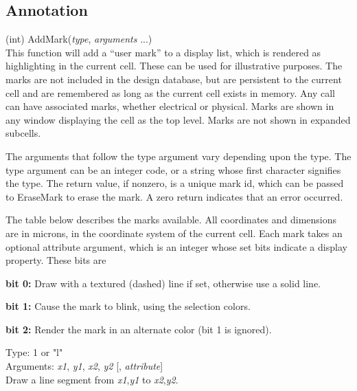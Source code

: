 \subsection{Annotation}

\begin{description}
\item{(int) \vt AddMark({\it type\/}, {\it arguments\/} ...)}\\
This function will add a ``user mark'' to a display list, which is
rendered as highlighting in the current cell.  These can be used for
illustrative purposes.  The marks are not included in the design
database, but are persistent to the current cell and are remembered as
long as the current cell exists in memory.  Any call can have
associated marks, whether electrical or physical.  Marks are shown in
any window displaying the cell as the top level.  Marks are not shown
in expanded subcells.

The arguments that follow the type argument vary depending upon the
type.  The type argument can be an integer code, or a string whose
first character signifies the type.  The return value, if nonzero, is
a unique mark id, which can be passed to {\vt EraseMark} to erase the
mark.  A zero return indicates that an error occurred.

The table below describes the marks available.  All coordinates and
dimensions are in microns, in the coordinate system of the current
cell.  Each mark takes an optional attribute argument, which is an
integer whose set bits indicate a display property.  These bits are

\begin{description}
\item{\bf bit 0:}
  Draw with a textured (dashed) line if set, otherwise use a solid line.
\item{\bf bit 1:}
  Cause the mark to blink, using the selection colors.
\item{\bf bit 2:}
  Render the mark in an alternate color (bit 1 is ignored).
\end{description}

\begin{description}
\item{Type: 1 or {\vt "l"}\\
Arguments: {\it x1\/}, {\it y1\/}, {\it x2\/}, {\it y2\/}
[, {\it attribute\/}]}\\
  Draw a line segment from {\it x1\/},{\it y1\/} to {\it x2\/},{\it y2\/}.


\end{description}
\end{description}
